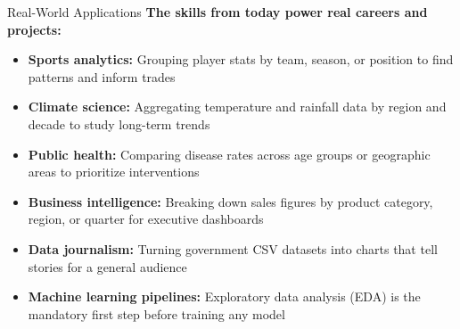 \documentclass{csbeamer}
\begin{document}
\begin{frame}{Real-World Applications}
    \textbf{The skills from today power real careers and projects:}

    \vspace{0.8em}

    \begin{itemize}
        \item<1-> \textbf{Sports analytics:} Grouping player stats by team, season, or position to find patterns and inform trades
        \item<2-> \textbf{Climate science:} Aggregating temperature and rainfall data by region and decade to study long-term trends
        \item<3-> \textbf{Public health:} Comparing disease rates across age groups or geographic areas to prioritize interventions
        \item<4-> \textbf{Business intelligence:} Breaking down sales figures by product category, region, or quarter for executive dashboards
        \item<5-> \textbf{Data journalism:} Turning government CSV datasets into charts that tell stories for a general audience
        \item<6-> \textbf{Machine learning pipelines:} Exploratory data analysis (EDA) is the mandatory first step before training any model
    \end{itemize}

    \vspace{0.8em}

\end{frame}
\end{document}
